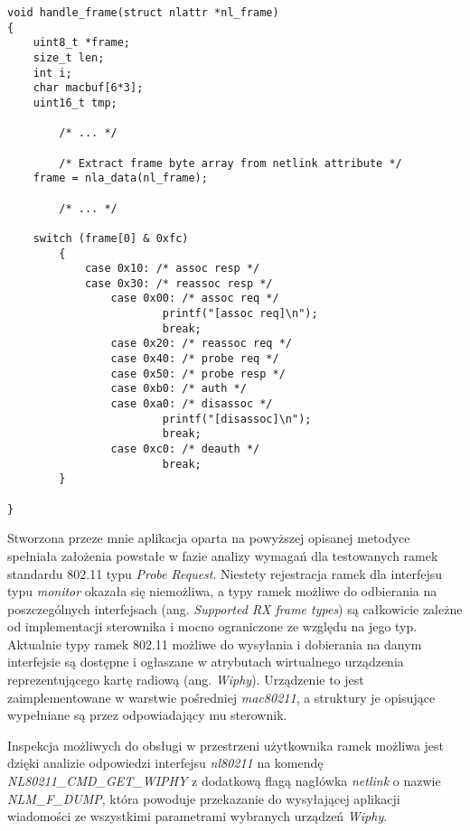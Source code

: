 \begin{lstlisting}[frame=tb]
void handle_frame(struct nlattr *nl_frame)
{
	uint8_t *frame;
	size_t len;
	int i;
	char macbuf[6*3];
	uint16_t tmp;
        
        /* ... */

        /* Extract frame byte array from netlink attribute */
	frame = nla_data(nl_frame);
        
        /* ... */

	switch (frame[0] & 0xfc) 
        {
	        case 0x10: /* assoc resp */
	        case 0x30: /* reassoc resp */
                case 0x00: /* assoc req */
                        printf("[assoc req]\n");
                        break;
                case 0x20: /* reassoc req */
                case 0x40: /* probe req */
                case 0x50: /* probe resp */
                case 0xb0: /* auth */
                case 0xa0: /* disassoc */
                        printf("[disassoc]\n");
                        break;
                case 0xc0: /* deauth */
                        break;
        }

}
\end{lstlisting}

Stworzona przeze mnie aplikacja oparta na powyższej opisanej metodyce spełniała założenia powstałe w fazie analizy wymagań dla testowanych ramek standardu 802.11 typu \emph{Probe Request}. Niestety rejestracja ramek dla interfejsu typu \emph{monitor} okazała się niemożliwa, a typy ramek możliwe do odbierania na poszczególnych interfejsach (ang. \emph{Supported RX frame types}) są całkowicie zależne od implementacji sterownika i mocno ograniczone ze względu na jego typ. Aktualnie typy ramek 802.11 możliwe do wysyłania i dobierania na danym interfejsie są dostępne i ogłaszane w atrybutach wirtualnego urządzenia reprezentującego kartę radiową (ang. \emph{Wiphy}). Urządzenie to jest zaimplementowane w warstwie pośredniej \emph{mac80211}, a struktury je opisujące wypełniane są przez odpowiadający mu sterownik.

Inspekcja możliwych do obsługi w przestrzeni użytkownika ramek możliwa jest dzięki analizie odpowiedzi interfejsu \emph{nl80211} na komendę \emph{NL80211\_CMD\_GET\_WIPHY} z dodatkową flagą nagłówka \emph{netlink} o nazwie \emph{NLM\_F\_DUMP}, która powoduje przekazanie do wysyłającej aplikacji wiadomości ze wszystkimi parametrami wybranych urządzeń \emph{Wiphy}.

